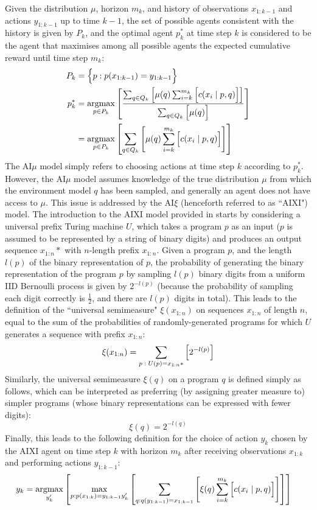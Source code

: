 Given the distribution $\mu$, horizon $m_k$, and history of observations $x_{1:k-1}$ and actions $y_{1:k-1}$ up to time $k-1$, the set of possible agents consistent with the history is given by $P_k$, and the optimal agent $p^*_k$ at time step $k$ is considered to be the agent that maximises among all possible agents the expected cumulative reward until time step $m_k$:
\begin{align*}
    P_k &= \Bigl\{ p:p(x_{1:k-1}) = y_{1:k-1} \Bigr\} \\
    p^*_k &= \underset{p\in P_k}{\operatorname{argmax}}\left[ \frac{\sum_{q\in Q_k}{\left[ \mu(q) \sum_{i=k}^{m_k}{\Bigl[ c(x_i \mid p, q) \Bigr]} \right]}}{\sum_{q\in Q_k}{\Bigl[ \mu(q) \Bigr]}} \right] \\
    &= \underset{p\in P_k}{\operatorname{argmax}}\left[ \sum_{q\in Q_k}{\left[ \mu(q) \sum_{i=k}^{m_k}{\Bigl[ c(x_i \mid p, q) \Bigr]} \right]} \right]
\end{align*}
The AI$\mu$ model simply refers to choosing actions at time step $k$ according to $p^*_k$. However, the AI$\mu$ model assumes knowledge of the true distribution $\mu$ from which the environment model $q$ has been sampled, and generally an agent does not have access to $\mu$. This issue is addressed by the AI$\xi$ (henceforth referred to as ``AIXI") model. The introduction to the AIXI model provided in \cite{hutter2000theory} starts by considering a universal prefix Turing machine $U$, which takes a program $p$ as an input ($p$ is assumed to be represented by a string of binary digits) and produces an output sequence $x_{1:n}*$ with $n$-length prefix $x_{1:n}$. Given a program $p$, and the length $l(p)$ of the binary representation of $p$, the probability of generating the binary representation of the program $p$ by sampling $l(p)$ binary digits from a uniform IID Bernoulli process is given by $2^{-l(p)}$ (because the probability of sampling each digit correctly is $\frac{1}{2}$, and there are $l(p)$ digits in total). This leads to the definition of the ``universal semimeasure" $\xi(x_{1:n})$ on sequences $x_{1:n}$ of length $n$, equal to the sum of the probabilities of randomly-generated programs for which $U$ generates a sequence with prefix $x_{1:n}$:
\begin{equation*}
    \xi(x_{1:n}) = \sum_{p\;:\;U(p)=x_{1:n}*}{\Bigl[ 2^{-l(p)} \Bigr]}
\end{equation*}
Similarly, the universal semimeasure $\xi(q)$ on a program $q$ is defined simply as follows, which can be interpreted as preferring (by assigning greater measure to) simpler programs (whose binary representations can be expressed with fewer digits):
\begin{equation*}
    \xi(q) = 2^{-l(q)}
\end{equation*}
Finally, this leads to the following definition for the choice of action $y_k$ chosen by the AIXI agent on time step $k$ with horizon $m_k$ after receiving observations $x_{1:k}$ and performing actions $y_{1:k-1}$:
\begin{align*}
    y_k &= \underset{y_k'}{\operatorname{argmax}}\left[ \max_{p:p(x_{1:k})=y_{1:k-1}y_k'}\left[ \sum_{q:q(y_{1:k-1})=x_{1:k-1}}{\left[ \xi(q) \sum_{i=k}^{m_k}{\Bigl[ c(x_i \mid p, q) \Bigr]} \right]} \right] \right]
\end{align*}
